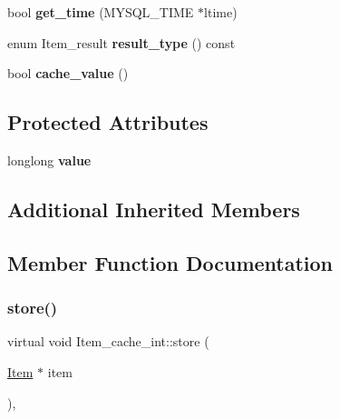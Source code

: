 \begin{DoxyCompactItemize}
\item 
\mbox{\label{classItem__cache__int_a56cf32c32396622d19a1cd4400166d90}} 
bool {\bfseries get\+\_\+time} (M\+Y\+S\+Q\+L\+\_\+\+T\+I\+ME $\ast$ltime)
\item 
\mbox{\label{classItem__cache__int_a0a4354bd61587912e2081e1c1056aeb0}} 
enum Item\+\_\+result {\bfseries result\+\_\+type} () const
\item 
\mbox{\label{classItem__cache__int_a3a0cce93332bc8562a89dda143745a0f}} 
bool {\bfseries cache\+\_\+value} ()
\end{DoxyCompactItemize}
\subsection*{Protected Attributes}
\begin{DoxyCompactItemize}
\item 
\mbox{\label{classItem__cache__int_a3ecd02ecd87ba5b09ed638c93a7816fd}} 
longlong {\bfseries value}
\end{DoxyCompactItemize}
\subsection*{Additional Inherited Members}


\subsection{Member Function Documentation}
\mbox{\label{classItem__cache__int_a657ce32793e936e705bf43fde85a2da4}} 
\subsubsection{\texorpdfstring{store()}{store()}}
{\footnotesize\ttfamily virtual void Item\+\_\+cache\+\_\+int\+::store (\begin{DoxyParamCaption}\item[{\mbox{\hyperlink{classItem}{Item}} $\ast$}]{item }\end{DoxyParamCaption})\hspace{0.3cm}{\ttfamily [inline]}, {\ttfamily [virtual]}}

